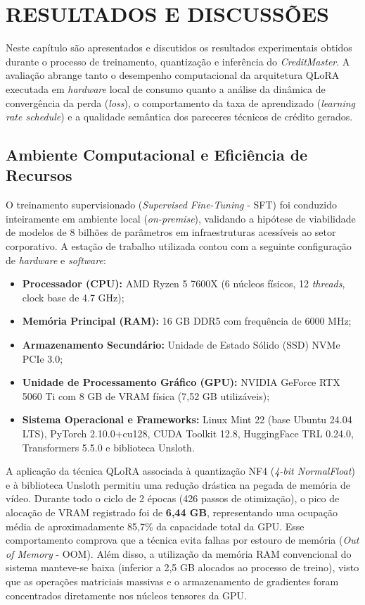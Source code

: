 \chapter{RESULTADOS E DISCUSSÕES}

Neste capítulo são apresentados e discutidos os resultados experimentais obtidos durante o processo de treinamento, quantização e inferência do \textit{CreditMaster}. A avaliação abrange tanto o desempenho computacional da arquitetura QLoRA executada em \textit{hardware} local de consumo quanto a análise da dinâmica de convergência da perda (\textit{loss}), o comportamento da taxa de aprendizado (\textit{learning rate schedule}) e a qualidade semântica dos pareceres técnicos de crédito gerados.

\section{Ambiente Computacional e Eficiência de Recursos}

O treinamento supervisionado (\textit{Supervised Fine-Tuning} - SFT) foi conduzido inteiramente em ambiente local (\textit{on-premise}), validando a hipótese de viabilidade de modelos de 8 bilhões de parâmetros em infraestruturas acessíveis ao setor corporativo. A estação de trabalho utilizada contou com a seguinte configuração de \textit{hardware} e \textit{software}:
\begin{itemize}
    \item \textbf{Processador (CPU):} AMD Ryzen 5 7600X (6 núcleos físicos, 12 \textit{threads}, clock base de 4.7 GHz);
    \item \textbf{Memória Principal (RAM):} 16 GB DDR5 com frequência de 6000 MHz;
    \item \textbf{Armazenamento Secundário:} Unidade de Estado Sólido (SSD) NVMe PCIe 3.0;
    \item \textbf{Unidade de Processamento Gráfico (GPU):} NVIDIA GeForce RTX 5060 Ti com 8 GB de VRAM física (7,52 GB utilizáveis);
    \item \textbf{Sistema Operacional e Frameworks:} Linux Mint 22 (base Ubuntu 24.04 LTS), PyTorch 2.10.0+cu128, CUDA Toolkit 12.8, HuggingFace TRL 0.24.0, Transformers 5.5.0 e biblioteca Unsloth.
\end{itemize}

A aplicação da técnica QLoRA associada à quantização NF4 (\textit{4-bit NormalFloat}) e à biblioteca Unsloth permitiu uma redução drástica na pegada de memória de vídeo. Durante todo o ciclo de 2 épocas (426 passos de otimização), o pico de alocação de VRAM registrado foi de \textbf{6,44 GB}, representando uma ocupação média de aproximadamente 85,7\% da capacidade total da GPU. Esse comportamento comprova que a técnica evita falhas por estouro de memória (\textit{Out of Memory} - OOM). Além disso, a utilização da memória RAM convencional do sistema manteve-se baixa (inferior a 2,5 GB alocados ao processo de treino), visto que as operações matriciais massivas e o armazenamento de gradientes foram concentrados diretamente nos núcleos tensores da GPU.

